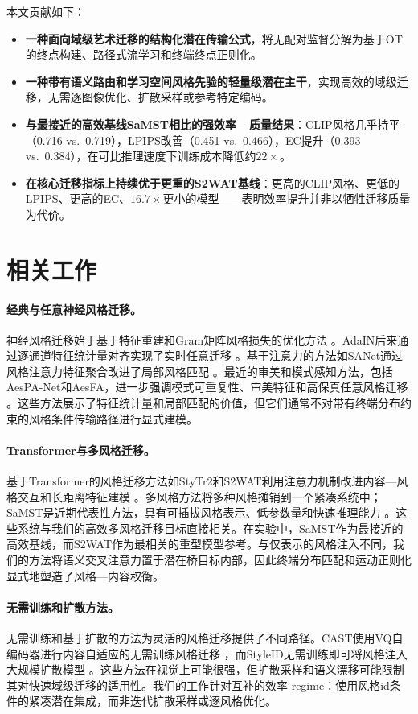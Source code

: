 \documentclass[letterpaper]{article}
\begin{document}
本文贡献如下：
\begin{itemize}
    \item \textbf{一种面向域级艺术迁移的结构化潜在传输公式}，将无配对监督分解为基于OT的终点构建、路径式流学习和终端终点正则化。
    \item \textbf{一种带有语义路由和学习空间风格先验的轻量级潜在主干}，实现高效的域级迁移，无需逐图像优化、扩散采样或参考特定编码。
    \item \textbf{与最接近的高效基线SaMST相比的强效率—质量结果}：CLIP风格几乎持平（0.716 vs.\ 0.719），LPIPS改善（0.451 vs.\ 0.466），EC提升（0.393 vs.\ 0.384），在可比推理速度下训练成本降低约$22\times$。
    \item \textbf{在核心迁移指标上持续优于更重的S2WAT基线}：更高的CLIP风格、更低的LPIPS、更高的EC、$16.7\times$更小的模型——表明效率提升并非以牺牲迁移质量为代价。
\end{itemize}

\section{相关工作}
\paragraph{经典与任意神经风格迁移。}
神经风格迁移始于基于特征重建和Gram矩阵风格损失的优化方法 \cite{gatys2016image}。AdaIN后来通过逐通道特征统计量对齐实现了实时任意迁移 \cite{huang2017adain}。基于注意力的方法如SANet通过风格注意力特征聚合改进了局部风格匹配 \cite{park2019sanet}。最近的审美和模式感知方法，包括AesPA-Net和AesFA，进一步强调模式可重复性、审美特征和高保真任意风格迁移 \cite{hong2023aespa,huang2024aesfa}。这些方法展示了特征统计量和局部匹配的价值，但它们通常不对带有终端分布约束的风格条件传输路径进行显式建模。

\paragraph{Transformer与多风格迁移。}
基于Transformer的风格迁移方法如StyTr2和S2WAT利用注意力机制改进内容—风格交互和长距离特征建模 \cite{deng2022stytr2,xia2024s2wat}。多风格方法将多种风格摊销到一个紧凑系统中；SaMST是近期代表性方法，具有可插拔风格表示、低参数量和快速推理能力 \cite{liu2024samst}。这些系统与我们的高效多风格迁移目标直接相关。在实验中，SaMST作为最接近的高效基线，而S2WAT作为最相关的重型模型参考。与仅表示的风格注入不同，我们的方法将语义交叉注意力置于潜在桥目标内部，因此终端分布匹配和运动正则化显式地塑造了风格—内容权衡。

\paragraph{无需训练和扩散方法。}
无需训练和基于扩散的方法为灵活的风格迁移提供了不同路径。CAST使用VQ自编码器进行内容自适应的无需训练风格迁移 \cite{gim2024cast}，而StyleID无需训练即可将风格注入大规模扩散模型 \cite{chung2024styleid}。这些方法在视觉上可能很强，但扩散采样和语义漂移可能限制其对快速域级迁移的适用性。我们的工作针对互补的效率 regime：使用风格id条件的紧凑潜在集成，而非迭代扩散采样或逐风格优化。
\end{document}
